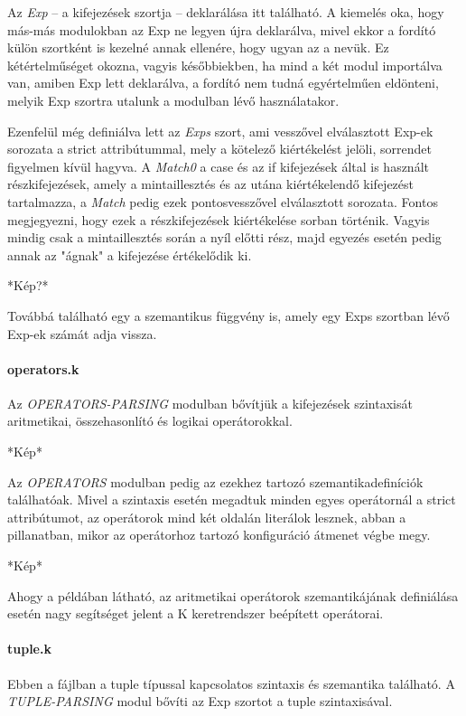 

Az \textit{Exp} -- a kifejezések szortja -- deklarálása itt található. A kiemelés oka, hogy más-más modulokban az Exp ne legyen újra deklarálva, mivel ekkor a fordító külön szortként is kezelné annak ellenére, hogy ugyan az a nevük. Ez kétértelműséget okozna, vagyis későbbiekben, ha mind a két modul importálva van, amiben Exp lett deklarálva, a fordító nem tudná egyértelműen eldönteni, melyik Exp szortra utalunk a modulban lévő használatakor.

Ezenfelül még definiálva lett az \textit{Exps} szort, ami vesszővel elválasztott Exp-ek sorozata a strict attribútummal, mely a kötelező kiértékelést jelöli, sorrendet figyelmen kívül hagyva. A \textit{Match0} a case és az if kifejezések által is használt részkifejezések, amely a mintaillesztés és az utána kiértékelendő kifejezést tartalmazza, a \textit{Match} pedig ezek pontosvesszővel elválasztott sorozata. Fontos megjegyezni, hogy ezek a részkifejezések kiértékelése sorban történik. Vagyis mindig csak a mintaillesztés során a nyíl előtti rész, majd egyezés esetén pedig annak az "ágnak" a kifejezése értékelődik ki.

*Kép?*

Továbbá található egy a szemantikus függvény is, amely egy Exps szortban lévő Exp-ek számát adja vissza.

\paragraph{operators.k}
Az \textit{OPERATORS-PARSING} modulban bővítjük a kifejezések szintaxisát aritmetikai, összehasonlító és logikai operátorokkal.

*Kép*

Az \textit{OPERATORS} modulban pedig az ezekhez tartozó szemantikadefiníciók találhatóak. Mivel a szintaxis esetén megadtuk minden egyes operátornál a strict attribútumot, az operátorok mind két oldalán literálok lesznek, abban a pillanatban, mikor az operátorhoz tartozó konfiguráció átmenet végbe megy.

*Kép*

Ahogy a példában látható, az aritmetikai operátorok szemantikájának definiálása esetén nagy segítséget jelent a K keretrendszer beépített operátorai.

\paragraph{tuple.k}
Ebben a fájlban a tuple típussal kapcsolatos szintaxis és szemantika található. A \textit{TUPLE-PARSING} modul bővíti az Exp szortot a tuple szintaxisával.

